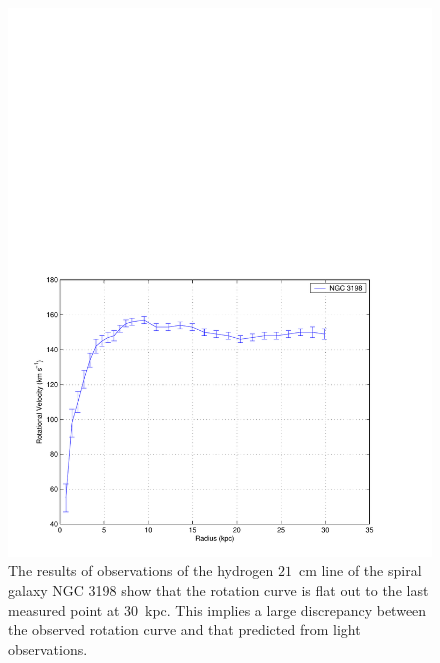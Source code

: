 \newpage

\begin{figure}[p]
\label{f:rotcurves}
\begin{center}
\includegraphics[width=\linewidth]{figures/macho/ngc3198}
\end{center}
\caption[H1 Rotation Curve of NGC 3198]{%
The results of observations of the hydrogen $21$~cm line of the spiral galaxy
NGC 3198 show that the rotation curve is flat out to the last measured point
at $30$~kpc\cite{1989A&A...223...47B}. This implies a large discrepancy
between the observed rotation curve and that predicted from light
observations.
}
\end{figure}

